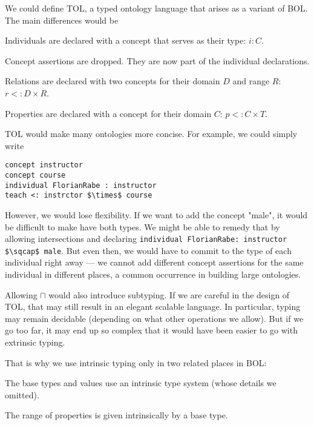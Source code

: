 \begin{example}
We could define TOL, a typed ontology language that arises as a variant of BOL.
The main differences would be
\begin{compactitem}
 \item Individuals are declared with a concept that serves as their type:  $i:C$.
 \item Concept assertions are dropped. They are now part of the individual declarations.
 \item Relations are declared with two concepts for their domain $D$ and range $R$:  $r<:D\times R$.
 \item Properties are declared with a concept for their domain $C$:  $p<:C\times T$.
\end{compactitem}

TOL would make many ontologies more concise.
For example, we could simply write
\begin{lstlisting}
concept instructor
concept course
individual FlorianRabe : instructor
teach <: instrctor $\times$ course
\end{lstlisting}

However, we would lose flexibility.
If we want to add the concept "male", it would be difficult to make {\FR} have both types.
We might be able to remedy that by allowing intersections and declaring \lstinline|individual FlorianRabe: instructor $\sqcap$ male|.
But even then, we would have to commit to the type of each individual right away --- we cannot add different concept assertions for the same individual in different places, a common occurrence in building large ontologies.

Allowing $\sqcap$ would also introduce subtyping.
If we are careful in the design of TOL, that may still result in an elegant scalable language.
In particular, typing may remain decidable (depending on what other operations we allow).
But if we go too far, it may end up so complex that it would have been easier to go with extrinsic typing.

That is why we use intrinsic typing only in two related places in BOL:
\begin{compactitem}
 \item The base types and values use an intrinsic type system (whose details we omitted).
 \item The range of properties is given intrinsically by a base type.
\end{compactitem}
\end{example}

